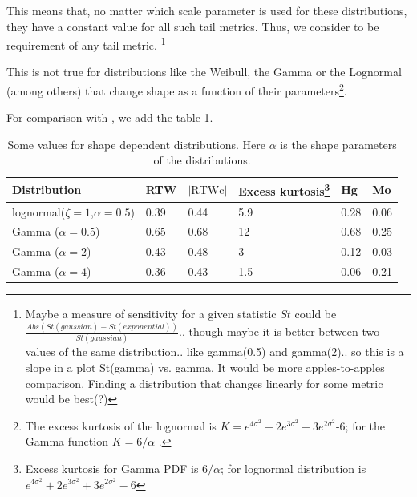 	This means that, no matter which scale parameter is used for these distributions, they have a constant value for all such tail metrics. 
	Thus, we consider to be requirement of any tail metric. \footnote{Maybe a measure of sensitivity for a given statistic $St$ could be $\frac{Abs(St(gaussian)-St(exponential))}{St(gaussian)}$.. though maybe it is better between two values of the same distribution.. like gamma(0.5) and gamma(2).. so this is a slope in a plot St(gamma) vs. gamma. It would be more apples-to-apples comparison. Finding a distribution that changes linearly for some metric would be best(?)
	}
	
	This is not true for distributions like the Weibull, the Gamma or the Lognormal (among others) that change shape as a function of their parameters\footnote{The excess kurtosis of the lognormal is $K=e^{4\sigma^2}+2e^{3\sigma^2}+3e^{2\sigma^2}$-6; for the Gamma function $K=6/\alpha$ .}.
	
	For comparison with \cite{Bono_2019}, we add the table \ref{table: changing shape}.
	
	\begin{table}[h]
		\centering
		\begin{tabular}{| l | l | l | l | l | l |}
			\hline
			Distribution & RTW & $\left| \mathrm{RTWc}\right| $  & Excess kurtosis\footnote{Excess kurtosis for Gamma PDF is $6/\alpha$; for lognormal distribution is $e^{4\sigma^2}+2e^{3\sigma^2}+3e^{2\sigma^2}-6$} & Hg & Mo\\
			\hline
			lognormal($\zeta=1$,$\alpha=0.5$) & 0.39 & 0.44 & 5.9  & 0.28 & 0.06 \\
			Gamma ($\alpha=0.5$)& 0.65 & 0.68 & 12  & 0.68 & 0.25 \\
			Gamma ($\alpha=2$)& 0.43 &0.48 & 3 &  0.12 & 0.03 \\
			Gamma ($\alpha=4$)& 0.36 & 0.43 & 1.5 & 0.06 & 0.21\\
			\hline
		\end{tabular}
			\caption{ Some values for shape dependent distributions. Here $\alpha$ is the shape parameters of the distributions.\label{tab:indices}}
		\label{table: changing shape}
	\end{table}
	
	
	
	
	
	
